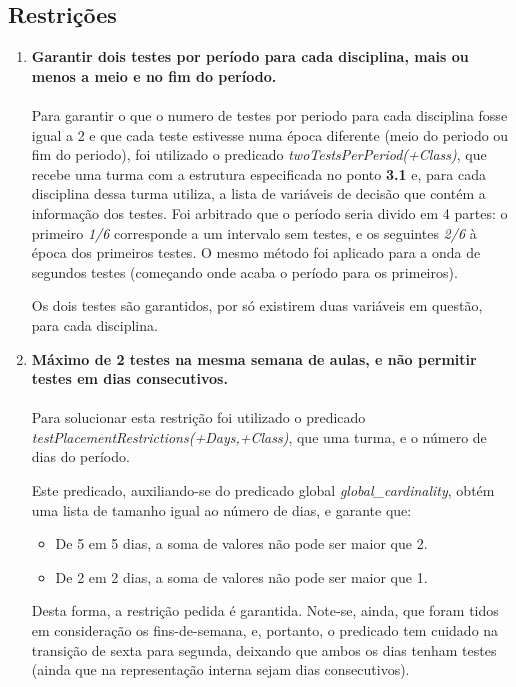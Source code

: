 \documentclass{llncs}
\begin{document}
\subsection{Restrições} 
\begin{enumerate}

	\item \textbf{Garantir dois testes por período para cada disciplina, mais ou menos a meio e no fim do período.}\\\\
		Para garantir o que o numero de testes por periodo para cada disciplina fosse igual a 2 e que cada teste estivesse numa época diferente (meio do periodo ou fim do periodo), foi utilizado o predicado 	               
		\textit{twoTestsPerPeriod(+Class)}, que recebe uma turma com a estrutura especificada no ponto  \textbf{3.1} e, para cada disciplina dessa turma utiliza, a lista de variáveis de decisão que contém a informação dos testes. Foi arbitrado que o período seria divido em 4 partes: o primeiro \textit{1/6} corresponde a um intervalo sem testes, e os seguintes \textit{2/6} à época dos primeiros testes. O mesmo método foi aplicado para a onda de segundos testes (começando onde acaba o período para os primeiros).\par
		Os dois testes são garantidos, por só existirem duas variáveis em questão, para cada disciplina.
		\\
	
\newpage
			
	\item \textbf{Máximo de 2 testes na mesma semana de aulas, e não permitir testes em dias consecutivos.} \\\\
		Para solucionar esta restrição foi utilizado o predicado \textit{testPlacementRestrictions(+Days,+Class)}, que uma turma, e o número de dias do período.\par
		Este predicado, auxiliando-se do predicado global \textit{global\_cardinality}, obtém uma lista de tamanho igual ao número de dias, e garante que:
		\begin{itemize}
			\item De 5 em 5 dias, a soma de valores não pode ser maior que 2.
			\item De 2 em 2 dias, a soma de valores não pode ser maior que 1.
		\end{itemize}
		Desta forma, a restrição pedida é garantida. Note-se, ainda, que foram tidos em consideração os fins-de-semana, e, portanto, o predicado tem cuidado na transição de sexta para segunda, deixando que ambos os dias tenham testes (ainda que na representação interna sejam dias consecutivos).
		\\


\end{enumerate}
\end{document}

